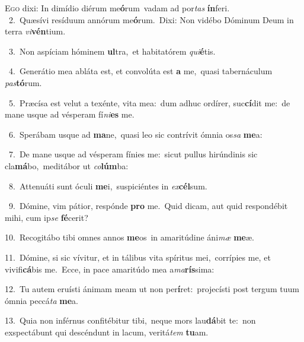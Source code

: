 \lettrine{\initial\textcolor{\initialcolor}{E}}{go} dixi: In dimídio diérum me\-\textbf{ó}\-rum~\star vadam ad por\textit{tas} \textbf{ín}\-feri.\\
{\numbfont\textcolor{\numbcolor}{~2.}}~Quæsívi resíduum annórum me\-\textbf{ó}\-rum.~\star Dixi: Non vidébo Dóminum Deum in terra \textit{vi}\-\textbf{vén}tium.\par
{\numbfont\textcolor{\numbcolor}{~3.}}~Non aspíciam hóminem \textbf{ul}\-tra,~\star et habitatórem \textit{qui}\-\textbf{é}tis.\par
{\numbfont\textcolor{\numbcolor}{~4.}}~Generátio mea abláta est, et convolúta est \textbf{a} me,~\star quasi tabernáculum \textit{pas}\-\textbf{tó}rum.\par
{\numbfont\textcolor{\numbcolor}{~5.}}~Præcísa est velut a texénte, vita mea:~\dagger dum adhuc ordírer, suc\-\textbf{cí}\-dit me:~\star de mane usque ad vésperam fí\-\textit{ni}\-\textbf{es} me.\par
{\numbfont\textcolor{\numbcolor}{~6.}}~Sperábam usque ad \textbf{ma}\-ne,~\star quasi leo sic contrívit ómnia os\textit{sa} \textbf{me}\-a:\par
{\numbfont\textcolor{\numbcolor}{~7.}}~De mane usque ad vésperam fínies me:~\dagger sicut pullus hirúndinis sic cla\-\textbf{má}\-bo,~\star meditábor ut \textit{co}\-\textbf{lúm}ba:\par
{\numbfont\textcolor{\numbcolor}{~8.}}~Attenuáti sunt óculi \textbf{me}\-i,~\star suspiciéntes in \textit{ex}\-\textbf{cél}sum.\par
{\numbfont\textcolor{\numbcolor}{~9.}}~Dómine, vim pátior, respónde \textbf{pro} me.~\star Quid dicam, aut quid respondébit mihi, cum ip\textit{se} \textbf{fé}\-cerit?\par
{\numbfont\textcolor{\numbcolor}{10.}}~Recogitábo tibi omnes annos \textbf{me}\-os~\star in amaritúdine áni\textit{mæ} \textbf{me}\-æ.\par
{\numbfont\textcolor{\numbcolor}{11.}}~Dómine, si sic vívitur, et in tálibus vita spíritus mei,~\dagger corrípies me, et vivifi\-\textbf{cá}\-bis me.~\star Ecce, in pace amaritúdo mea a\-\textit{ma}\-\textbf{rís}sima:\par
{\numbfont\textcolor{\numbcolor}{12.}}~Tu autem eruísti ánimam meam ut non per\-\textbf{í}\-ret:~\star projecísti post tergum tuum ómnia peccá\textit{ta} \textbf{me}\-a.\par
{\numbfont\textcolor{\numbcolor}{13.}}~Quia non inférnus confitébitur tibi,~\dagger neque mors lau\-\textbf{dá}\-bit te:~\star non exspectábunt qui descéndunt in lacum, veritá\textit{tem} \textbf{tu}\-am.\par
